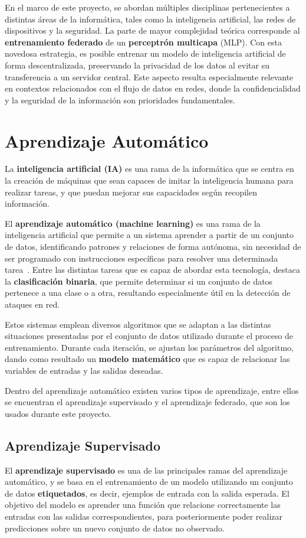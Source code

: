 En el marco de este proyecto, se abordan múltiples disciplinas pertenecientes a distintas áreas de la informática, tales como la inteligencia artificial, las redes de dispositivos y la seguridad.
La parte de mayor complejidad teórica corresponde al \textbf{entrenamiento federado} de un \textbf{perceptrón multicapa} (MLP). Con esta novedosa estrategia, es posible entrenar un modelo de inteligencia artificial de forma descentralizada, preservando la privacidad de los datos al evitar su transferencia a un servidor central. Este aspecto resulta especialmente relevante en contextos relacionados con el flujo de datos en redes, donde la confidencialidad y la seguridad de la información son prioridades fundamentales.

\section{Aprendizaje Automático}
\label{sec:AprendizajeAutomático}
La \textbf{inteligencia artificial (IA)} es una rama de la informática que se centra en la creación de máquinas que sean capaces de imitar la inteligencia humana para realizar tareas, y que puedan mejorar sus capacidades según recopilen información.

El \textbf{aprendizaje automático (machine learning)} es una rama de la inteligencia artificial que permite a un sistema aprender a partir de un conjunto de datos, identificando patrones y relaciones de forma autónoma, sin necesidad de ser programado con instrucciones específicas para resolver una determinada tarea~\cite{machine_learning}. Entre las distintas tareas que es capaz de abordar esta tecnología, destaca la \textbf{clasificación binaria}, que permite determinar si un conjunto de datos pertenece a una clase o a otra, resultando especialmente útil en la detección de ataques en red.

Estos sistemas emplean diversos algoritmos que se adaptan a las distintas situaciones presentadas por el conjunto de datos utilizado durante el proceso de entrenamiento. Durante cada iteración, se ajustan los parámetros del algoritmo, dando como resultado un \textbf{modelo matemático} que es capaz de relacionar las variables de entradas y las salidas deseadas.

Dentro del aprendizaje automático existen varios tipos de aprendizaje, entre ellos se encuentran el aprendizaje supervisado y el aprendizaje federado, que son los usados durante este proyecto.

\subsection{Aprendizaje Supervisado}
\label{subsec:AprendizajeSupervisado}
El \textbf{aprendizaje supervisado} es una de las principales ramas del aprendizaje automático, y se basa en el entrenamiento de un modelo utilizando un conjunto de datos \textbf{etiquetados}, es decir, ejemplos de entrada con la salida esperada. El objetivo del modelo es aprender una función que relacione correctamente las entradas con las salidas correspondientes, para posteriormente poder realizar predicciones sobre un nuevo conjunto de datos no observado.

